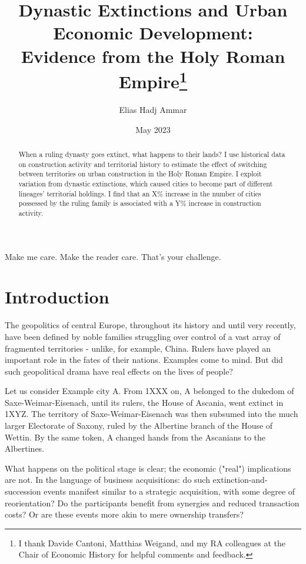 \documentclass{article}
\title{Dynastic Extinctions and Urban Economic Development: \\Evidence from the Holy Roman Empire\footnote{I thank Davide Cantoni, Matthias Weigand, and my RA colleagues at the Chair of Economic History for helpful comments and feedback.}
}
\author{Elias Hadj Ammar}
\date{May 2023}
\begin{document}
\onehalfspacing
\maketitle
\thispagestyle{empty}

\begin{abstract}
When a ruling dynasty goes extinct, what happens to their lands? I use historical data on construction activity and territorial history to estimate the effect of switching between territories on urban construction in the Holy Roman Empire. I exploit variation from dynastic extinctions, which caused cities to become part of different lineages' territorial holdings. I find that an X\% increase in the number of cities possessed by the ruling family is associated with a Y\% increase in construction activity.
\end{abstract}




\newpage

\setcounter{page}{1}
\doublespacing

 
Make me care.
Make the reader care. That's your challenge.



\section{Introduction}

The geopolitics of central Europe, throughout its history and until very recently, have been defined by noble families struggling over control of a vast array of fragmented territories - unlike, for example, China. Rulers have played an important role in the fates of their nations. Examples come to mind. But did such geopolitical drama have real effects on the lives of people? 

Let us consider Example city A. From 1XXX on, A belonged to the dukedom of Saxe-Weimar-Eisenach, until its rulers, the House of Ascania, went extinct in 1XYZ. The territory of Saxe-Weimar-Eisenach was then subsumed into the much larger Electorate of Saxony, ruled by the Albertine branch of the House of Wettin. By the same token, A changed hands from the Ascanians to the Albertines.

What happens on the political stage is clear; the economic ("real") implications are not. In the language of business acquisitions: do such extinction-and-succession events manifest similar to a strategic acquisition, with some degree of reorientation? Do the participants benefit from synergies and reduced transaction costs? Or are these events more akin to mere ownership transfers?
\end{document}
